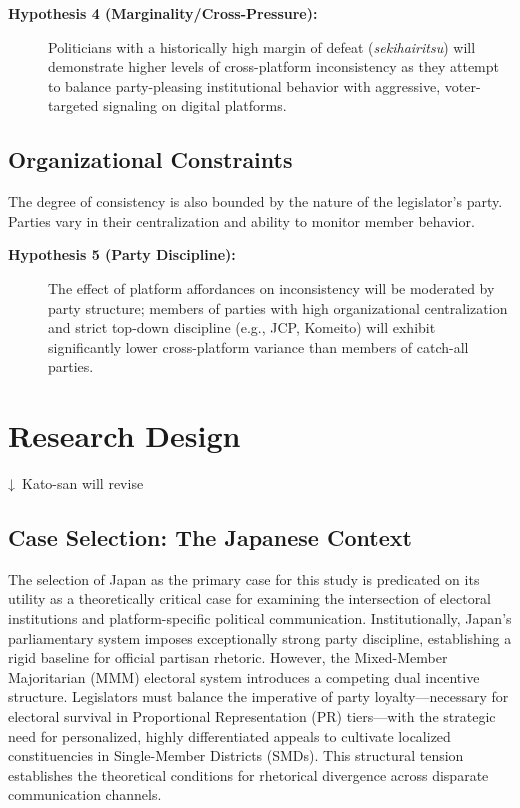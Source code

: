 \documentclass[11pt,letterpaper]{article}
\theoremstyle{plain}
\begin{document}
\begin{description}
    \item[\textbf{Hypothesis 4 (Marginality/Cross-Pressure):}] Politicians with a historically high margin of defeat (\textit{sekihairitsu}) will demonstrate higher levels of cross-platform inconsistency as they attempt to balance party-pleasing institutional behavior with aggressive, voter-targeted signaling on digital platforms.
\end{description}

\subsection{Organizational Constraints}
The degree of consistency is also bounded by the nature of the legislator's party. Parties vary in their centralization and ability to monitor member behavior.

\begin{description}
    \item[\textbf{Hypothesis 5 (Party Discipline):}] The effect of platform affordances on inconsistency will be moderated by party structure; members of parties with high organizational centralization and strict top-down discipline (e.g., JCP, Komeito) will exhibit significantly lower cross-platform variance than members of catch-all parties.
\end{description}
\section{Research Design}
{\color{red}↓~Kato-san will revise}

\subsection{Case Selection: The Japanese Context}

The selection of Japan as the primary case for this study is predicated on its utility as a theoretically critical case for examining the intersection of electoral institutions and platform-specific political communication. Institutionally, Japan's parliamentary system imposes exceptionally strong party discipline, establishing a rigid baseline for official partisan rhetoric. However, the Mixed-Member Majoritarian (MMM) electoral system introduces a competing dual incentive structure. Legislators must balance the imperative of party loyalty---necessary for electoral survival in Proportional Representation (PR) tiers---with the strategic need for personalized, highly differentiated appeals to cultivate localized constituencies in Single-Member Districts (SMDs). This structural tension establishes the theoretical conditions for rhetorical divergence across disparate communication channels.
\end{document}
